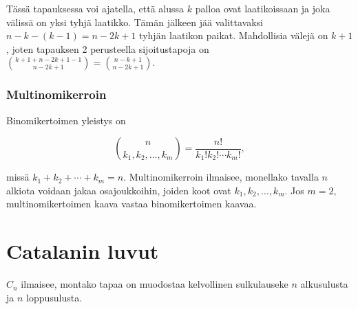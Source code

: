 \begin{center}
\end{center}

Tässä tapauksessa voi ajatella, että alussa $k$ palloa
ovat laatikoissaan ja joka välissä on yksi tyhjä laatikko.
Tämän jälkeen jää valittavaksi $n-k-(k-1)=n-2k+1$ tyhjän laatikon paikat.
Mahdollisia välejä on $k+1$, joten tapauksen 2 perusteella
sijoitustapoja on ${k+1+n-2k+1-1 \choose n-2k+1} = {n-k+1 \choose n-2k+1}$.

\subsubsection{Multinomikerroin}


Binomikertoimen yleistys on 

\[ {n \choose k_1,k_2,\ldots,k_m} = \frac{n!}{k_1! k_2! \cdots k_m!}, \]

missä $k_1+k_2+\cdots+k_m=n$.
Multinomikerroin ilmaisee, monellako tavalla $n$ alkiota voidaan jakaa osajoukkoihin,
joiden koot ovat $k_1,k_2,\ldots,k_m$.
Jos $m=2$, multinomikertoimen kaava vastaa binomikertoimen kaavaa.

\section{Catalanin luvut}


 $C_n$ ilmaisee,
montako tapaa on muodostaa kelvollinen sulkulauseke
$n$ alkusulusta ja $n$ loppusulusta.


